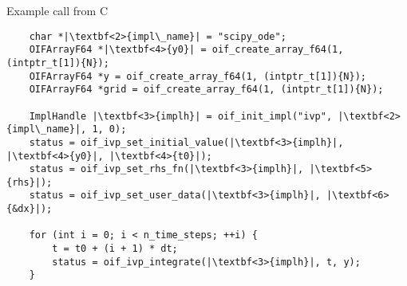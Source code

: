 \documentclass[10pt, aspectratio=169, progressbar=frametitle]{beamer}
\begin{document}
\begin{frame}[fragile]{Example call from C}
  \begin{verbatim}
    char *|\textbf<2>{impl\_name}| = "scipy_ode";
    OIFArrayF64 *|\textbf<4>{y0}| = oif_create_array_f64(1, (intptr_t[1]){N});
    OIFArrayF64 *y = oif_create_array_f64(1, (intptr_t[1]){N});
    OIFArrayF64 *grid = oif_create_array_f64(1, (intptr_t[1]){N});

    ImplHandle |\textbf<3>{implh}| = oif_init_impl("ivp", |\textbf<2>{impl\_name}|, 1, 0);
    status = oif_ivp_set_initial_value(|\textbf<3>{implh}|, |\textbf<4>{y0}|, |\textbf<4>{t0}|);
    status = oif_ivp_set_rhs_fn(|\textbf<3>{implh}|, |\textbf<5>{rhs}|);
    status = oif_ivp_set_user_data(|\textbf<3>{implh}|, |\textbf<6>{&dx}|);

    for (int i = 0; i < n_time_steps; ++i) {
        t = t0 + (i + 1) * dt;
        status = oif_ivp_integrate(|\textbf<3>{implh}|, t, y);
    }
  \end{verbatim}
\end{frame}
\end{document}
